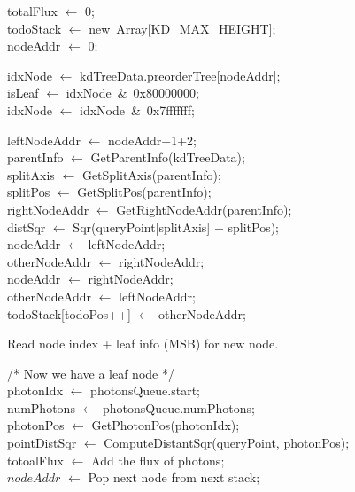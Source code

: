 \begin{algorithm}
	\SetAlgoLined
	
	totalFlux \(\leftarrow\) 0; \\
	todoStack \(\leftarrow\) new\ Array[KD\_MAX\_HEIGHT]; \\
	nodeAddr \(\leftarrow\) 0; \\

	 {

		idxNode \(\leftarrow\) kdTreeData.preorderTree[nodeAddr]; \\ 
		isLeaf \(\leftarrow\) idxNode\ \&\ 0x80000000; \\ 
		idxNode \(\leftarrow\) idxNode\ \&\ 0x7fffffff; \\ 
		
		 {
			leftNodeAddr \(\leftarrow\) nodeAddr+1+2; \\
		
			parentInfo \(\leftarrow\) GetParentInfo(kdTreeData); \\
			splitAxis \(\leftarrow\) GetSplitAxis(parentInfo); \\ 
			splitPos \(\leftarrow\) GetSplitPos(parentInfo); \\
			rightNodeAddr \(\leftarrow\) GetRightNodeAddr(parentInfo); \\
		
			distSqr \(\leftarrow\) Sqr(queryPoint[splitAxis] \(-\) splitPos); \\ 
			
			nodeAddr \(\leftarrow\) leftNodeAddr; \\
			otherNodeAddr \(\leftarrow\) rightNodeAddr; \\
			 {
				nodeAddr \(\leftarrow\) rightNodeAddr; \\
				otherNodeAddr \(\leftarrow\) leftNodeAddr; \\
			}
			 { 
				todoStack[todoPos++] \(\leftarrow\) otherNodeAddr; \\ 
			} 
			
			Read node index + leaf info (MSB) for new node. \\
		}
		
		/* Now we have a leaf node */ \\
		photonIdx \(\leftarrow\) photonsQueue.start; \\
		numPhotons \(\leftarrow\) photonsQueue.numPhotons; \\
		 {
			photonPos \(\leftarrow\) GetPhotonPos(photonIdx); \\
			pointDistSqr \(\leftarrow\) ComputeDistantSqr(queryPoint, photonPos); \\
			 {
				totoalFlux \(\leftarrow\) Add the flux of photons; \\
			} 
		} 
		\(nodeAddr\) \(\leftarrow\) Pop next node from next stack; \\	
	}	
	

\end{algorithm}
